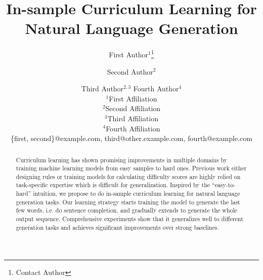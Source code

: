\documentclass[11pt]{article}
\title{In-sample Curriculum Learning for Natural Language Generation}
\author{
First Author$^1$\footnote{Contact Author}\and
Second Author$^2$\and
Third Author$^{2,3}$\And
Fourth Author$^4$\\
\affiliations
$^1$First Affiliation\\
$^2$Second Affiliation\\
$^3$Third Affiliation\\
$^4$Fourth Affiliation\\
\emails
\{first, second\}@example.com,
third@other.example.com,
fourth@example.com
}
\begin{document}
\maketitle

\begin{abstract}
Curriculum learning has shown promising improvements in multiple domains by 
training machine learning models from easy samples to hard ones. 
Previous work either designing rules or training models for calculating difficulty scores are highly relied on task-specific expertise which is difficult for generalization. Inspired by the ``easy-to-hard'' intuition, we propose to do in-sample curriculum learning for natural language generation tasks. Our learning strategy starts training the model to generate the last few words, i.e. do sentence completion, and gradually extends to generate the whole output sequence.
Comprehensive experiments show that it generalizes well to different generation 
tasks and achieves significant improvements over strong baselines.
\end{abstract}










\end{document}
